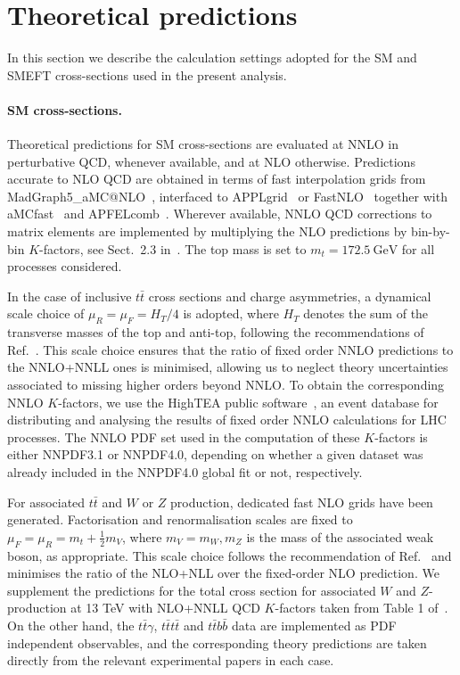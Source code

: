 \documentclass[withindex,glossary]{cam-thesis}
\begin{document}
\section{Theoretical predictions}
\label{sec:theory}

In this section we describe the calculation settings adopted
for the SM and SMEFT cross-sections used in the present analysis.

\paragraph{SM cross-sections.}
%
Theoretical predictions for SM cross-sections are evaluated at NNLO in perturbative QCD, whenever
available, and at NLO otherwise.
%
Predictions accurate to NLO QCD are obtained in terms of fast interpolation grids from {\sc\small MadGraph5\_aMC@NLO}~\cite{Frederix:2018nkq,Alwall:2014hca}, 
interfaced to {\sc\small APPLgrid}~\cite{Carli:2010rw} or {\sc\small FastNLO}~\cite{Kluge:2006xs,Wobisch:2011ij,Britzger:2012bs} together 
with {\sc\small aMCfast}~\cite{Bertone:2014zva} and {\sc\small APFELcomb}~\cite{Bertone:2016lga}.
%
Wherever available, NNLO QCD corrections to matrix elements are  implemented  by multiplying the NLO predictions by bin-by-bin $K$-factors, see Sect.~2.3 in~\cite{Ball:2014uwa}.
%
The top mass is set to $m_t = 172.5\ \text{GeV}$ for all processes considered.

In the case of inclusive $t\bar{t}$ cross sections and charge asymmetries,
a dynamical scale choice of $\mu_R = \mu_F = H_T/4$
is adopted, where $H_T$ denotes the sum of the transverse masses of the top and anti-top,
following the recommendations of Ref.~\cite{Czakon:2016dgf}.
%
This scale choice ensures that
the ratio of fixed order NNLO predictions to the NNLO+NNLL ones is minimised,
allowing us to neglect theory uncertainties associated to missing higher orders beyond NNLO. 
%
To obtain the corresponding
NNLO $K$-factors, we use the {\sc\small HighTEA} public software~\cite{Czakon:2023hls}, 
an event database for distributing and analysing the results of fixed order NNLO
calculations for LHC processes.
%
The NNLO PDF set used in the computation of these $K$-factors is either 
NNPDF3.1 or NNPDF4.0, depending on whether a given dataset was already included
in the NNPDF4.0 global fit or not, respectively.

For associated $t\bar{t}$ and $W$ or $Z$ production, dedicated fast NLO grids  have been generated.
%
Factorisation and renormalisation scales are fixed to $\mu_F = \mu_R = m_t + \frac{1}{2}m_V$, where $m_V = m_W, m_Z$ is the mass of the associated weak boson,
as appropriate.
%
This scale choice follows the recommendation of Ref.~\cite{Kulesza:2018tqz} and minimises the ratio of the NLO+NLL over the fixed-order NLO prediction.
%
We supplement the predictions for the total cross section for associated $W$ and $Z$-production at 13 TeV with NLO+NNLL QCD $K$-factors taken from Table 1 of~\cite{Kulesza:2018tqz}.
%
On the other hand, the $t\bar{t}\gamma$, $t\bar{t}t\bar{t}$ and $t\bar{t}b\bar{b}$ data are implemented as PDF independent observables, and the corresponding theory predictions are taken directly from the relevant experimental papers in each case.
\end{document}

